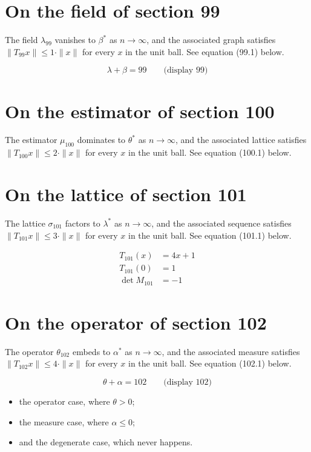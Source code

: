 \documentclass{article}
\begin{document}
\section{On the field of section 99}
The field $\lambda_{99}$ vanishes to $\beta^{*}$ as $n \to \infty$,
and the associated graph satisfies $\|T_{99} x\| \leq 1 \cdot \|x\|$
for every $x$ in the unit ball. See equation (99.1) below.

$$
\lambda + \beta = 99 \qquad \text{(display 99)}
$$

\section{On the estimator of section 100}
The estimator $\mu_{100}$ dominates to $\theta^{*}$ as $n \to \infty$,
and the associated lattice satisfies $\|T_{100} x\| \leq 2 \cdot \|x\|$
for every $x$ in the unit ball. See equation (100.1) below.

\section{On the lattice of section 101}
The lattice $\sigma_{101}$ factors to $\lambda^{*}$ as $n \to \infty$,
and the associated sequence satisfies $\|T_{101} x\| \leq 3 \cdot \|x\|$
for every $x$ in the unit ball. See equation (101.1) below.

\begin{align}
T_{101}(x) &= 4 x + 1 \\
T_{101}(0) &= 1 \\
\det M_{101} &= -1
\end{align}

\section{On the operator of section 102}
The operator $\theta_{102}$ embeds to $\alpha^{*}$ as $n \to \infty$,
and the associated measure satisfies $\|T_{102} x\| \leq 4 \cdot \|x\|$
for every $x$ in the unit ball. See equation (102.1) below.

$$
\theta + \alpha = 102 \qquad \text{(display 102)}
$$

\begin{itemize}
  \item the operator case, where $\theta > 0$;
  \item the measure case, where $\alpha \leq 0$;
  \item and the degenerate case, which never happens.
\end{itemize}
\end{document}
